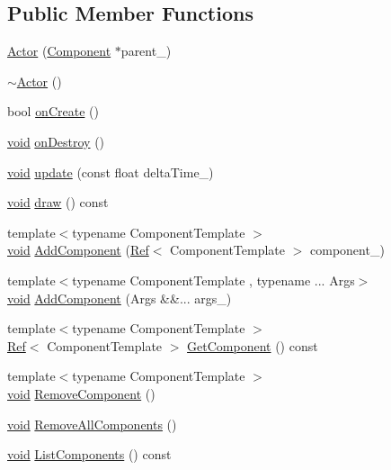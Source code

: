 \subsection*{Public Member Functions}
\begin{DoxyCompactItemize}
\item 
\hyperlink{classActor_a7b296cba96bef9d1cc5893114078f1da}{Actor} (\hyperlink{classComponent}{Component} $\ast$parent\+\_\+)
\item 
\hyperlink{classActor_ad807fe8f85e72ab263a0c05e3231cb39}{$\sim$\+Actor} ()
\item 
bool \hyperlink{classActor_a56a241c949adf52cedceb45a7102ea1a}{on\+Create} ()
\item 
\hyperlink{imgui__impl__opengl3__loader_8h_ac668e7cffd9e2e9cfee428b9b2f34fa7}{void} \hyperlink{classActor_a47101d6275509662bf6c84c3f3439696}{on\+Destroy} ()
\item 
\hyperlink{imgui__impl__opengl3__loader_8h_ac668e7cffd9e2e9cfee428b9b2f34fa7}{void} \hyperlink{classActor_a724ff8f2e9c34f15a6c443a3912504c4}{update} (const float delta\+Time\+\_\+)
\item 
\hyperlink{imgui__impl__opengl3__loader_8h_ac668e7cffd9e2e9cfee428b9b2f34fa7}{void} \hyperlink{classActor_adbbdc379c1a471cc9763d871b0790d7e}{draw} () const
\item 
{\footnotesize template$<$typename Component\+Template $>$ }\\\hyperlink{imgui__impl__opengl3__loader_8h_ac668e7cffd9e2e9cfee428b9b2f34fa7}{void} \hyperlink{classActor_aa8ff3a6ac0f5a1bc18145be0b0de9475}{Add\+Component} (\hyperlink{BStateMachine_2Component_8h_add5e90b302c31b74a46619f240214bcc}{Ref}$<$ Component\+Template $>$ component\+\_\+)
\item 
{\footnotesize template$<$typename Component\+Template , typename ... Args$>$ }\\\hyperlink{imgui__impl__opengl3__loader_8h_ac668e7cffd9e2e9cfee428b9b2f34fa7}{void} \hyperlink{classActor_a279bb9d2c8a6e29cc406c1ff5c4bec31}{Add\+Component} (Args \&\&... args\+\_\+)
\item 
{\footnotesize template$<$typename Component\+Template $>$ }\\\hyperlink{BStateMachine_2Component_8h_add5e90b302c31b74a46619f240214bcc}{Ref}$<$ Component\+Template $>$ \hyperlink{classActor_aea332ed79b7b46b238dd3bb6cdae42df}{Get\+Component} () const
\item 
{\footnotesize template$<$typename Component\+Template $>$ }\\\hyperlink{imgui__impl__opengl3__loader_8h_ac668e7cffd9e2e9cfee428b9b2f34fa7}{void} \hyperlink{classActor_ae1c8e36dc78e7faf430e76209319247d}{Remove\+Component} ()
\item 
\hyperlink{imgui__impl__opengl3__loader_8h_ac668e7cffd9e2e9cfee428b9b2f34fa7}{void} \hyperlink{classActor_ac9310e2ea7c464852e901b508a103222}{Remove\+All\+Components} ()
\item 
\hyperlink{imgui__impl__opengl3__loader_8h_ac668e7cffd9e2e9cfee428b9b2f34fa7}{void} \hyperlink{classActor_aa296fdff7201b411576f757da1dc335c}{List\+Components} () const
\end{DoxyCompactItemize}
